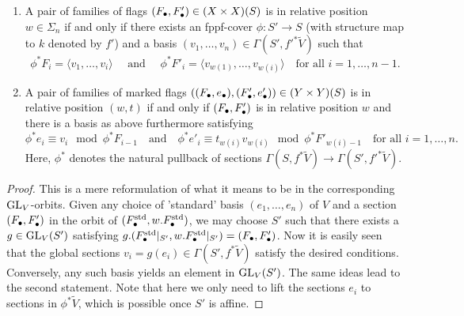 \documentclass[../main.tex]{subfiles}
\begin{document}
\begin{lem}\label{lem:RelativePositionVecCrit}
  \begin{enumerate}
    \item A pair of families of flags $(F_\bullet, F_\bullet') \in (X \times X)(S)$ is 
      in relative position $w \in \Sigma_n$ if and only if there exists an
      fppf-cover $ \phi\colon  S' \to S$ (with structure map to $k$ denoted by
      $f'$) and a basis $(v_1, \dots, v_n) \in \Gamma(S', f'^*\tilde V)$ such
      that 
      \begin{equation*}
        \phi^* F_i  = \langle v_1, \dots, v_i \rangle
        \quad \text{ and } \quad 
        \phi^* F'_i  = \langle v_{w(1)}, \dots, v_{w(i)} \rangle 
        \quad \text{for all } i = 1, \dots, n-1.
      \end{equation*}
    \item A pair of families of marked flags $((F_\bullet, e_\bullet), (F_\bullet', e_\bullet'))
      \in (Y \times Y)(S)$
      is in relative position $(w,t)$ if and only if $(F_\bullet, F_\bullet')$ is in relative
      position $w$ and there is a basis as above furthermore satisfying
      \begin{equation*}
        \phi^* e_i \equiv v_i \mod \phi^*F_{i-1} \quad \text{and} \quad
        \phi^*e'_i \equiv t_{w(i)}v_{w(i)} \mod \phi^*F'_{w(i)-1} \quad
        \text{for all } i = 1, \dots, n.
      \end{equation*}
      Here, $\phi^*$ denotes the natural pullback of sections
      $\Gamma(S, f^*\tilde V) \to \Gamma(S', f'^* \tilde V)$.
  \end{enumerate}
\begin{proof}
  This is a mere reformulation of what it means to be in the corresponding
  $\operatorname{GL}_V$-orbits. Given any choice 
  of 'standard' basis $(e_1, \dots, e_n)$ of $V$ and a section $(F_\bullet, F_\bullet')$
  in the orbit of $(F_\bullet^{\mathrm{std}}, w.F_\bullet^{\mathrm{std}})$, we
  may choose $S'$ such that there exists a $g \in \operatorname{GL}_V(S')$ 
  satisfying $g.(F_\bullet^{\mathrm{std}}|_{S'}, w.F_\bullet^{\mathrm{std}}|_{S'}) = (F_\bullet, F_\bullet')$.
  Now it is easily seen that the global sections $v_i = g(e_i) \in \Gamma(S',
  f^*\tilde V)$ satisfy the desired conditions. Conversely, any such basis
  yields an element in $\operatorname{GL}_V(S')$. The same ideas lead to the second statement.
  Note that here we only need to lift the sections $e_i$ to sections 
  in $\phi^* \tilde V$, which is possible once $S'$ is affine. 
\end{proof}
\end{lem}
\end{document}
